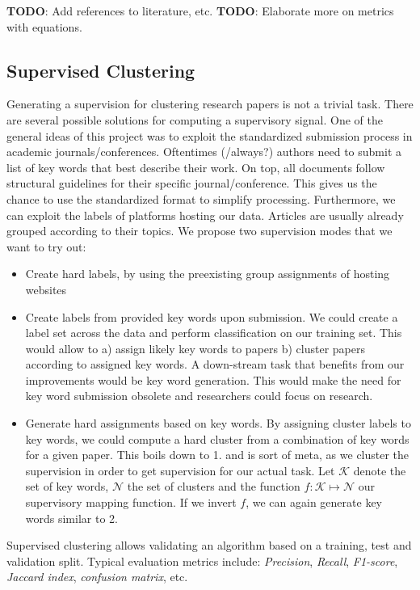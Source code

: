 \textbf{TODO}: Add references to literature, etc.
\textbf{TODO}: Elaborate more on metrics with equations.

\subsection{Supervised Clustering}
Generating a supervision for clustering research papers is not a trivial task. There are several possible solutions for computing a supervisory signal. One of the general ideas of this project was to exploit the standardized submission process in academic journals/conferences. Oftentimes (/always?) authors need to submit a list of key words that best describe their work. On top, all documents follow structural guidelines for their specific journal/conference. This gives us the chance to use the standardized format to simplify processing. Furthermore, we can exploit the labels of platforms hosting our data. Articles are usually already grouped according to their topics. We propose two supervision modes that we want to try out: 
\begin{itemize}
	\item Create hard labels, by using the preexisting group assignments of hosting websites
	\item Create labels from provided key words upon submission. We could create a label set across the data and perform classification on our training set. This would allow to a) assign likely key words to papers b) cluster papers according to assigned key words. A down-stream task that benefits from our improvements would be key word generation. This would make the need for key word submission obsolete and researchers could focus on research.
	\item Generate hard assignments based on key words. By assigning cluster labels to key words, we could compute a hard cluster from a combination of key words for a given paper. This boils down to 1. and is sort of meta, as we cluster the supervision in order to get supervision for our actual task. Let $ \mathcal{K} $ denote the set of key words, $ \mathcal{N} $ the set of clusters and the function $ f\colon \mathcal{K} \mapsto \mathcal{N} $ our supervisory mapping function. If we invert $ f $, we can again generate key words similar to 2.
\end{itemize}

Supervised clustering allows validating an algorithm based on a training, test and validation split. Typical evaluation metrics include: \textit{Precision}, \textit{Recall}, \textit{F1-score}, \textit{Jaccard index}, \textit{confusion matrix}, etc.

